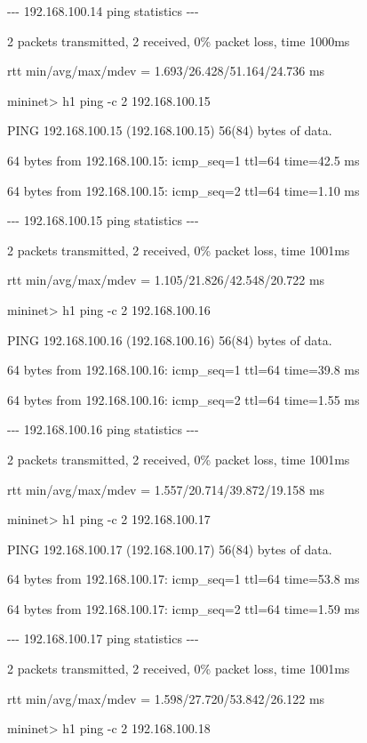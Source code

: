 \bigskip

{}-{}-{}- 192.168.100.14 ping statistics -{}-{}-

2 packets transmitted, 2 received, 0\% packet loss, time 1000ms

rtt min/avg/max/mdev = 1.693/26.428/51.164/24.736 ms

mininet{\textgreater} h1 ping -c 2 192.168.100.15

PING 192.168.100.15 (192.168.100.15) 56(84) bytes of data.

64 bytes from 192.168.100.15: icmp\_seq=1 ttl=64 time=42.5 ms

64 bytes from 192.168.100.15: icmp\_seq=2 ttl=64 time=1.10 ms


\bigskip

{}-{}-{}- 192.168.100.15 ping statistics -{}-{}-

2 packets transmitted, 2 received, 0\% packet loss, time 1001ms

rtt min/avg/max/mdev = 1.105/21.826/42.548/20.722 ms

mininet{\textgreater} h1 ping -c 2 192.168.100.16

PING 192.168.100.16 (192.168.100.16) 56(84) bytes of data.

64 bytes from 192.168.100.16: icmp\_seq=1 ttl=64 time=39.8 ms

64 bytes from 192.168.100.16: icmp\_seq=2 ttl=64 time=1.55 ms


\bigskip

{}-{}-{}- 192.168.100.16 ping statistics -{}-{}-

2 packets transmitted, 2 received, 0\% packet loss, time 1001ms

rtt min/avg/max/mdev = 1.557/20.714/39.872/19.158 ms

mininet{\textgreater} h1 ping -c 2 192.168.100.17

PING 192.168.100.17 (192.168.100.17) 56(84) bytes of data.

64 bytes from 192.168.100.17: icmp\_seq=1 ttl=64 time=53.8 ms

64 bytes from 192.168.100.17: icmp\_seq=2 ttl=64 time=1.59 ms


\bigskip

{}-{}-{}- 192.168.100.17 ping statistics -{}-{}-

2 packets transmitted, 2 received, 0\% packet loss, time 1001ms

rtt min/avg/max/mdev = 1.598/27.720/53.842/26.122 ms

mininet{\textgreater} h1 ping -c 2 192.168.100.18

